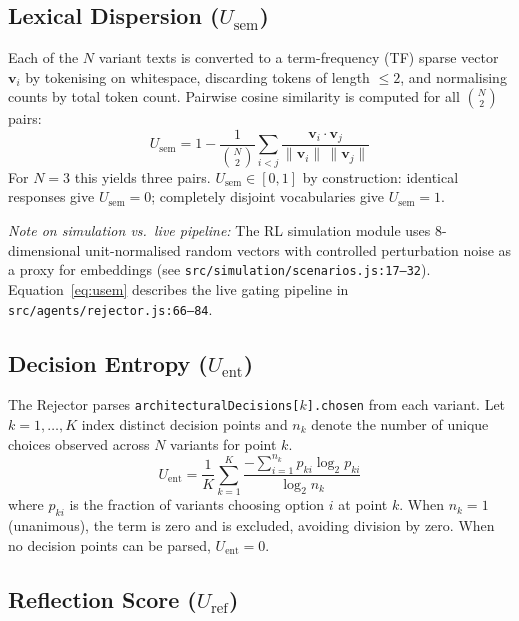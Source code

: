 \documentclass[conference]{IEEEtran}
\newcommand{\Usem}{U_{\mathrm{sem}}}
\newcommand{\Uent}{U_{\mathrm{ent}}}
\newcommand{\Uref}{U_{\mathrm{ref}}}
\begin{document}
\subsection{Lexical Dispersion (\texorpdfstring{$\Usem$}{Usem})}

Each of the $N$ variant texts is converted to a term-frequency (TF) sparse
vector $\mathbf{v}_i$ by tokenising on whitespace, discarding tokens of
length $\leq 2$, and normalising counts by total token count.
Pairwise cosine similarity is computed for all $\binom{N}{2}$ pairs:
\begin{equation}
  \label{eq:usem}
  \Usem = 1 - \frac{1}{\binom{N}{2}}
          \sum_{i < j}
          \frac{\mathbf{v}_i \cdot \mathbf{v}_j}
               {\|\mathbf{v}_i\|\,\|\mathbf{v}_j\|}
\end{equation}
For $N{=}3$ this yields three pairs.
$\Usem \in [0,1]$ by construction: identical responses give $\Usem{=}0$;
completely disjoint vocabularies give $\Usem{=}1$.

\noindent\textit{Note on simulation vs.~live pipeline:}
The RL simulation module uses 8-dimensional unit-normalised random vectors
with controlled perturbation noise as a proxy for embeddings (see
\texttt{src/simulation/scenarios.js:17--32}).
Equation~\eqref{eq:usem} describes the live gating pipeline in
\texttt{src/agents/rejector.js:66--84}.

\subsection{Decision Entropy (\texorpdfstring{$\Uent$}{Uent})}

The Rejector parses \texttt{architecturalDecisions[$k$].chosen} from each
variant.
Let $k = 1,\ldots,K$ index distinct decision points and $n_k$ denote the
number of unique choices observed across $N$ variants for point $k$.
\begin{equation}
  \label{eq:uent}
  \Uent = \frac{1}{K} \sum_{k=1}^{K}
          \frac{-\sum_{i=1}^{n_k} p_{ki} \log_2 p_{ki}}{\log_2 n_k}
\end{equation}
where $p_{ki}$ is the fraction of variants choosing option $i$ at point $k$.
When $n_k{=}1$ (unanimous), the term is zero and is excluded, avoiding
division by zero.
When no decision points can be parsed, $\Uent{=}0$.

\subsection{Reflection Score (\texorpdfstring{$\Uref$}{Uref})}
\end{document}
